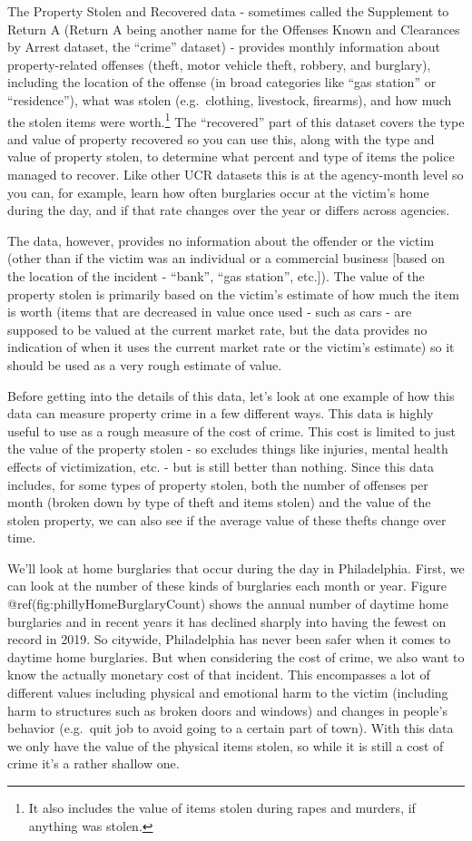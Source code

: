 \documentclass[
  12pt,
  openany]{book}
\begin{document}
The Property Stolen and Recovered data - sometimes called the Supplement to Return A (Return A being another name for the Offenses Known and Clearances by Arrest dataset, the ``crime'' dataset) - provides monthly information about property-related offenses (theft, motor vehicle theft, robbery, and burglary), including the location of the offense (in broad categories like ``gas station'' or ``residence''), what was stolen (e.g.~clothing, livestock, firearms), and how much the stolen items were worth.\footnote{It also includes the value of items stolen during rapes and murders, if anything was stolen.} The ``recovered'' part of this dataset covers the type and value of property recovered so you can use this, along with the type and value of property stolen, to determine what percent and type of items the police managed to recover. Like other UCR datasets this is at the agency-month level so you can, for example, learn how often burglaries occur at the victim's home during the day, and if that rate changes over the year or differs across agencies.

The data, however, provides no information about the offender or the victim (other than if the victim was an individual or a commercial business {[}based on the location of the incident - ``bank'', ``gas station'', etc.{]}). The value of the property stolen is primarily based on the victim's estimate of how much the item is worth (items that are decreased in value once used - such as cars - are supposed to be valued at the current market rate, but the data provides no indication of when it uses the current market rate or the victim's estimate) so it should be used as a very rough estimate of value.

Before getting into the details of this data, let's look at one example of how this data can measure property crime in a few different ways. This data is highly useful to use as a rough measure of the cost of crime. This cost is limited to just the value of the property stolen - so excludes things like injuries, mental health effects of victimization, etc. - but is still better than nothing. Since this data includes, for some types of property stolen, both the number of offenses per month (broken down by type of theft and items stolen) and the value of the stolen property, we can also see if the average value of these thefts change over time.

We'll look at home burglaries that occur during the day in Philadelphia. First, we can look at the number of these kinds of burglaries each month or year. Figure @ref(fig:phillyHomeBurglaryCount) shows the annual number of daytime home burglaries and in recent years it has declined sharply into having the fewest on record in 2019. So citywide, Philadelphia has never been safer when it comes to daytime home burglaries. But when considering the cost of crime, we also want to know the actually monetary cost of that incident. This encompasses a lot of different values including physical and emotional harm to the victim (including harm to structures such as broken doors and windows) and changes in people's behavior (e.g.~quit job to avoid going to a certain part of town). With this data we only have the value of the physical items stolen, so while it is still a cost of crime it's a rather shallow one.
\end{document}
